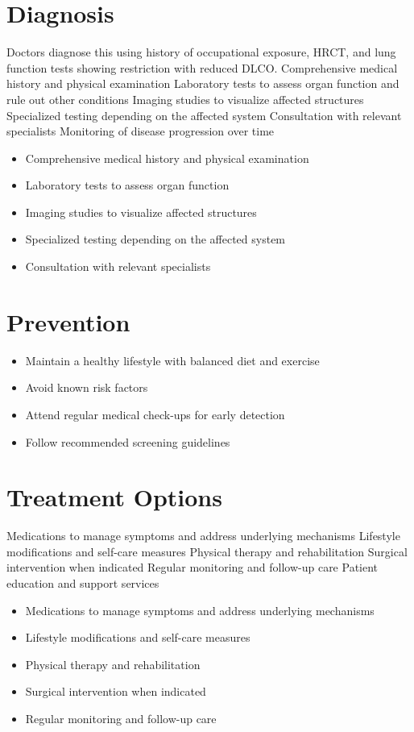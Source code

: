 \section{Diagnosis}
Doctors diagnose this using history of occupational exposure, HRCT, and lung function tests showing restriction with reduced DLCO. Comprehensive medical history and physical examination Laboratory tests to assess organ function and rule out other conditions Imaging studies to visualize affected structures Specialized testing depending on the affected system Consultation with relevant specialists Monitoring of disease progression over time

\begin{itemize}[noitemsep]
  \item Comprehensive medical history and physical examination
  \item Laboratory tests to assess organ function
  \item Imaging studies to visualize affected structures
  \item Specialized testing depending on the affected system
  \item Consultation with relevant specialists
\end{itemize}
\section{Prevention}
\begin{itemize}[noitemsep]
  \item Maintain a healthy lifestyle with balanced diet and exercise
  \item Avoid known risk factors
  \item Attend regular medical check-ups for early detection
  \item Follow recommended screening guidelines
\end{itemize}
\section{Treatment Options}
Medications to manage symptoms and address underlying mechanisms Lifestyle modifications and self-care measures Physical therapy and rehabilitation Surgical intervention when indicated Regular monitoring and follow-up care Patient education and support services

\begin{itemize}[noitemsep]
  \item Medications to manage symptoms and address underlying mechanisms
  \item Lifestyle modifications and self-care measures
  \item Physical therapy and rehabilitation
  \item Surgical intervention when indicated
  \item Regular monitoring and follow-up care
\end{itemize}
